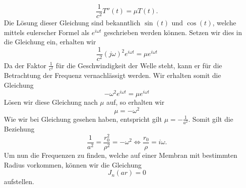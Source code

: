 \begin{equation}
\frac{1}{c^2} T''(t) = \mu T(t).
\end{equation} 
Die Lösung dieser Gleichung sind bekanntlich $\sin(t)$ und $\cos(t)$, welche mittels eulerscher Formel als $e^{i\omega t}$ geschrieben werden können.
Setzen wir dies in die Gleichung ein, erhalten wir
\begin{equation}
\frac{1}{c^2}(j\omega)^2 e^{i\omega t} = \mu e^{i\omega t}
\end{equation}
Da der Faktor $\frac{1}{c^2}$ für die Geschwindigkeit der Welle steht, kann er für die Betrachtung der Frequenz vernachlässigt werden. Wir erhalten somit die Gleichung
\begin{equation}
-\omega^2 e^{i\omega t} = \mu e^{i\omega t}
\end{equation}
Lösen wir diese Gleichung nach $\mu$ auf, so erhalten wir
\begin{equation}
\mu = -\omega^2
\end{equation}
Wie wir bei Gleichung  gesehen haben, entspricht gilt $\mu = -\frac{1}{a^2}$. Somit gilt die Beziehung
\begin{equation}
\frac{1}{a^2} = \frac{r_0^2}{\rho^2} = -\omega^2
\Leftrightarrow
\frac{r_0}{\rho} = i\omega.
\end{equation}
Um nun die Frequenzen zu finden, welche auf einer Membran mit bestimmten Radius vorkommen, können wir die Gleichung
\begin{equation}
J_n(ar) = 0
\end{equation}
aufstellen.

